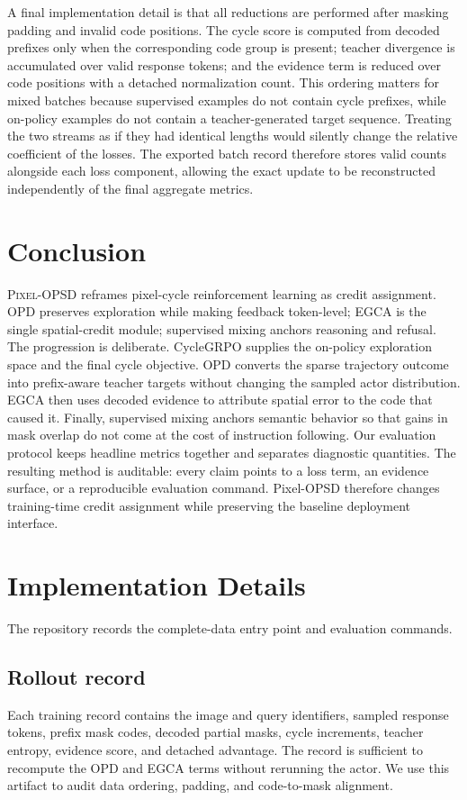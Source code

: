 \documentclass{article}
\newcommand{\ours}{\textsc{Pixel-OPSD}}
\begin{document}
A final implementation detail is that all reductions are performed after masking padding and invalid code positions. The cycle score is computed from decoded prefixes only when the corresponding code group is present; teacher divergence is accumulated over valid response tokens; and the evidence term is reduced over code positions with a detached normalization count. This ordering matters for mixed batches because supervised examples do not contain cycle prefixes, while on-policy examples do not contain a teacher-generated target sequence. Treating the two streams as if they had identical lengths would silently change the relative coefficient of the losses. The exported batch record therefore stores valid counts alongside each loss component, allowing the exact update to be reconstructed independently of the final aggregate metrics.

\section{Conclusion}\ours{} reframes pixel-cycle reinforcement learning as credit assignment. OPD preserves exploration while making feedback token-level; EGCA is the single spatial-credit module; supervised mixing anchors reasoning and refusal. The progression is deliberate. CycleGRPO supplies the on-policy exploration space and the final cycle objective. OPD converts the sparse trajectory outcome into prefix-aware teacher targets without changing the sampled actor distribution. EGCA then uses decoded evidence to attribute spatial error to the code that caused it. Finally, supervised mixing anchors semantic behavior so that gains in mask overlap do not come at the cost of instruction following. Our evaluation protocol keeps headline metrics together and separates diagnostic quantities. The resulting method is auditable: every claim points to a loss term, an evidence surface, or a reproducible evaluation command. Pixel-OPSD therefore changes training-time credit assignment while preserving the baseline deployment interface.
\clearpage\begingroup\nocite{*}\endgroup\clearpage\appendix\section{Implementation Details}The repository records the complete-data entry point and evaluation commands.
\subsection{Rollout record}Each training record contains the image and query identifiers, sampled response tokens, prefix mask codes, decoded partial masks, cycle increments, teacher entropy, evidence score, and detached advantage. The record is sufficient to recompute the OPD and EGCA terms without rerunning the actor. We use this artifact to audit data ordering, padding, and code-to-mask alignment.
\end{document}
